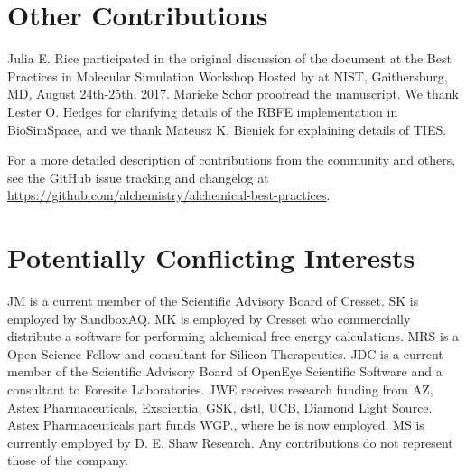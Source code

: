 \documentclass[9pt,bestpractices]{livecoms}
\newcommand{\githubrepository}{\url{https://github.com/alchemistry/alchemical-best-practices}} %
\begin{document}
\section*{Other Contributions}
%
Julia E. Rice participated in the original discussion of the document at the Best Practices in Molecular Simulation Workshop Hosted by at NIST, Gaithersburg, MD, August 24th-25th, 2017.
Marieke Schor proofread the manuscript.
We thank Lester O. Hedges for clarifying details of the RBFE implementation in BioSimSpace, and we thank Mateusz K. Bieniek for explaining details of TIES.


For a more detailed description of contributions from the community and others, 
see the GitHub issue tracking and changelog at \githubrepository.


\section*{Potentially Conflicting Interests}
JM is a current member of the Scientific Advisory Board of Cresset. 
SK is employed by SandboxAQ.
MK is employed by Cresset who commercially distribute a software for performing alchemical free energy calculations. MRS is a Open Science Fellow and consultant for Silicon Therapeutics.
JDC is a current member of the Scientific Advisory Board of OpenEye Scientific Software and a consultant to Foresite Laboratories.
JWE receives research funding from AZ, Astex Pharmaceuticals, Exscientia, GSK, dstl, UCB, Diamond Light Source. Astex Pharmaceuticals part funds WGP., where he is now employed.
MS is currently employed by D. E. Shaw Research. Any contributions do not represent those of the company. 
\end{document}

